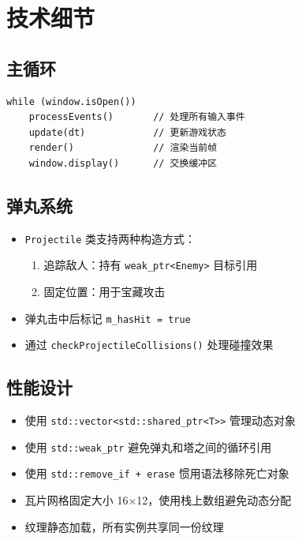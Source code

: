 \documentclass[12pt,a4paper]{ctexart}
\begin{document}
\section{技术细节}

\subsection{主循环}

\begin{lstlisting}[caption={Game::run() 主循环伪代码}]
while (window.isOpen())
    processEvents()       // 处理所有输入事件
    update(dt)            // 更新游戏状态
    render()              // 渲染当前帧
    window.display()      // 交换缓冲区
\end{lstlisting}

\subsection{弹丸系统}

\begin{itemize}
    \item \texttt{Projectile} 类支持两种构造方式：
    \begin{enumerate}
        \item 追踪敌人：持有 \texttt{weak\_ptr<Enemy>} 目标引用
        \item 固定位置：用于宝藏攻击
    \end{enumerate}
    \item 弹丸击中后标记 \texttt{m\_hasHit = true}
    \item 通过 \texttt{checkProjectileCollisions()} 处理碰撞效果
\end{itemize}

\subsection{性能设计}

\begin{itemize}
    \item 使用 \texttt{std::vector<std::shared\_ptr<T>>} 管理动态对象
    \item 使用 \texttt{std::weak\_ptr} 避免弹丸和塔之间的循环引用
    \item 使用 \texttt{std::remove\_if + erase} 惯用语法移除死亡对象
    \item 瓦片网格固定大小 16×12，使用栈上数组避免动态分配
    \item 纹理静态加载，所有实例共享同一份纹理
\end{itemize}
\end{document}
